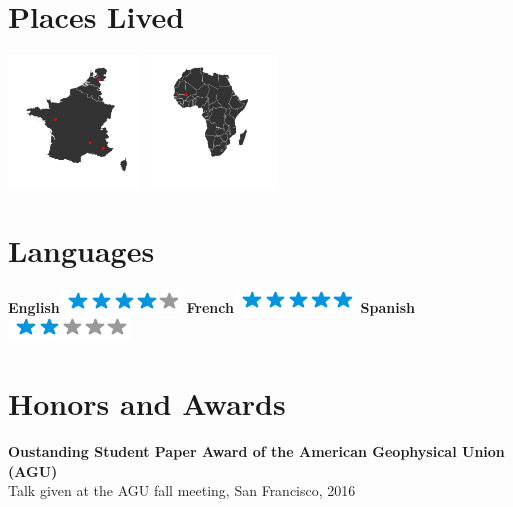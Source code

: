 \documentclass[]{friggeri-cv}
\begin{document}
\begin{aside}
~
~
~
  \section{Places Lived}
    \includegraphics[width=3.5cm]{img/map.png}
    \includegraphics[width=3.5cm]{img/mapAfrica.png}
    ~
  \section{Languages}
    \textbf{English}\includegraphics[scale=0.40]{img/4stars.png}
    \textbf{French}\includegraphics[scale=0.40]{img/5stars.png}
    \textbf{Spanish}\includegraphics[scale=0.40]{img/2stars.png}
\end{aside}

\section{Honors and Awards}
	\textbf{Oustanding Student Paper Award of the American Geophysical Union (AGU)}\\
	Talk given at the AGU fall meeting, San Francisco, 2016
\end{document}
